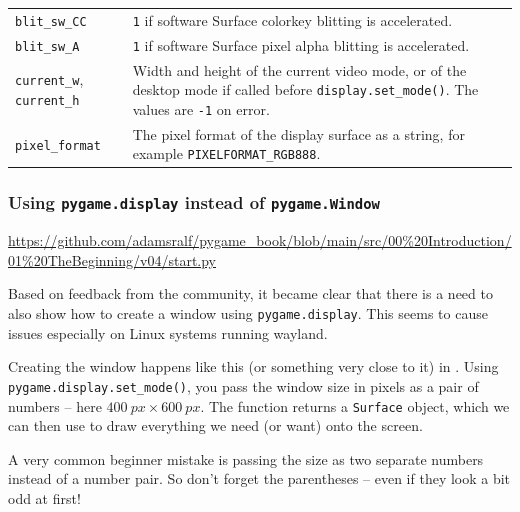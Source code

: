 \begin{longtable}{p{4cm} p{10cm}}
	\texttt{blit\_sw\_CC} &
	\texttt{1} if software Surface colorkey blitting is accelerated. \\
	
	\texttt{blit\_sw\_A} &
	\texttt{1} if software Surface pixel alpha blitting is accelerated. \\
	
	\texttt{current\_w}, \texttt{current\_h} &
	Width and height of the current video mode, or of the desktop mode if
	called before \texttt{display.set\_mode()}.
	The values are \texttt{-1} on error. \\
	
	\texttt{pixel\_format} &
	The pixel format of the display surface as a string,
	for example \texttt{PIXELFORMAT\_RGB888}. \\
	
\end{longtable}

\newpage
{}


\subsubsection{Using \texttt{pygame.display} instead of \texttt{pygame.Window}}
\begin{diskbox}
	\url{https://github.com/adamsralf/pygame_book/blob/main/src/00%20Introduction/01%20TheBeginning/v04/start.py}
\end{diskbox}

Based on feedback from the community, it became clear that there is a need to also show how to create a window using \texttt{pygame.display}. This seems to cause issues especially on Linux systems running \Gls{wayland}.

Creating the window happens like this (or something very close to it) in . Using \texttt{pygame.dis\-play.set\_mode()}, you pass the window size in pixels as a pair of numbers -- here $\SI{400}{px}\times \SI{600}{px}$. The function returns a \texttt{Surface} object, which we can then use to draw everything we need (or want) onto the screen.

\begin{warningbox}
	A very common beginner mistake is passing the size as two separate numbers instead of a number pair. So don’t forget the parentheses -- even if they look a bit odd at first!
\end{warningbox}


